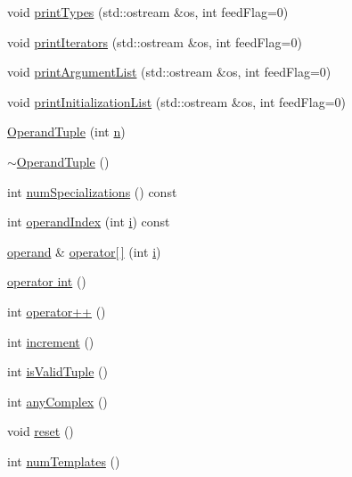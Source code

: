 \begin{DoxyCompactItemize}
\item 
void \hyperlink{classOperandTuple_a898061d733b17c51f51a952f45b76feb}{print\+Types} (std\+::ostream \&os, int feed\+Flag=0)
\item 
void \hyperlink{classOperandTuple_a0bdd8142dc77e2b776e6096c990d879f}{print\+Iterators} (std\+::ostream \&os, int feed\+Flag=0)
\item 
void \hyperlink{classOperandTuple_ad2be15feea698e764856894886d4c9fd}{print\+Argument\+List} (std\+::ostream \&os, int feed\+Flag=0)
\item 
void \hyperlink{classOperandTuple_ae37bf3e47d4b81809aeacc11641e0f04}{print\+Initialization\+List} (std\+::ostream \&os, int feed\+Flag=0)
\item 
\hyperlink{classOperandTuple_af6fd7f3956a21cdca80dc9444533ec53}{Operand\+Tuple} (int \hyperlink{indexexpr_8h_ab427e2e2b4d6cec55fa088ea2a692ace}{n})
\item 
\hyperlink{classOperandTuple_a509132d109793e4a21e07ba80bbf73df}{$\sim$\+Operand\+Tuple} ()
\item 
int \hyperlink{classOperandTuple_a27c1b58866b219420fe71abedc09386d}{num\+Specializations} () const 
\item 
int \hyperlink{classOperandTuple_a8009866e71d1237e04c99ccf7133f0e9}{operand\+Index} (int \hyperlink{indexexpr_8h_aabd77643995707c185e95c8cb2782c81}{i}) const 
\item 
\hyperlink{classoperand}{operand} \& \hyperlink{classOperandTuple_a9c721b4ed8a871c0f66f54852501ccea}{operator\mbox{[}$\,$\mbox{]}} (int \hyperlink{indexexpr_8h_aabd77643995707c185e95c8cb2782c81}{i})
\item 
\hyperlink{classOperandTuple_a12ff861b7814bf051ddc1627f57768da}{operator int} ()
\item 
int \hyperlink{classOperandTuple_ad99ec5e23042e65727d8dbd76f09f661}{operator++} ()
\item 
int \hyperlink{classOperandTuple_a165bfc973ac7afe50fafb974d3a40719}{increment} ()
\item 
int \hyperlink{classOperandTuple_a2941c29584aee3a7f5793695f9e92ca4}{is\+Valid\+Tuple} ()
\item 
int \hyperlink{classOperandTuple_a95affb4bef0ae31c59da95dd5081aada}{any\+Complex} ()
\item 
void \hyperlink{classOperandTuple_a5eb486204afa29098ffdf47091c53b1d}{reset} ()
\item 
int \hyperlink{classOperandTuple_a1bfb53e8c4fd77bcf90dc5350806f396}{num\+Templates} ()
\item 

\end{DoxyCompactItemize}
